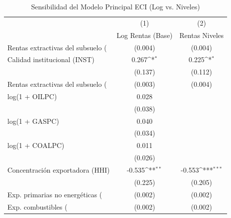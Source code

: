 \begin{table}[htbp]\centering
\def\sym#1{\ifmmode^{#1}\else\(^{#1}\)\fi}
\caption{Sensibilidad del Modelo Principal ECI (Log vs. Niveles)}
\begin{tabular}{l*{2}{c}}
\toprule
                    &\multicolumn{1}{c}{(1)}&\multicolumn{1}{c}{(2)}\\
                    &\multicolumn{1}{c}{Log Rentas (Base)}&\multicolumn{1}{c}{Rentas Niveles}\\
\midrule
Rentas extractivas del subsuelo (%
                    &     (0.004)         &     (0.004)         \\
\addlinespace
Calidad institucional (INST)&       0.267\sym{*}  &       0.225\sym{*}  \\
                    &     (0.137)         &     (0.112)         \\
\addlinespace
Rentas extractivas del subsuelo (%
                    &     (0.003)         &     (0.004)         \\
\addlinespace
log(1 + OILPC)      &       0.028         &                     \\
                    &     (0.038)         &                     \\
\addlinespace
log(1 + GASPC)      &       0.040         &                     \\
                    &     (0.034)         &                     \\
\addlinespace
log(1 + COALPC)     &       0.011         &                     \\
                    &     (0.026)         &                     \\
\addlinespace
Concentración exportadora (HHI)&      -0.535\sym{**} &      -0.553\sym{***}\\
                    &     (0.225)         &     (0.205)         \\
\addlinespace
Exp. primarias no energéticas (%
                    &     (0.002)         &     (0.002)         \\
\addlinespace
Exp. combustibles (%
                    &     (0.002)         &     (0.002)         \\

\end{tabular}
\end{table}
